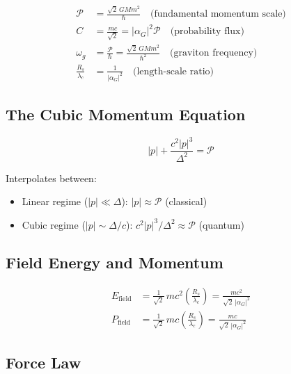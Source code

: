 \documentclass[11pt,a4paper]{article}
\theoremstyle{definition}
\theoremstyle{remark}
\begin{document}
	\begin{align}
		\mathcal{P} &= \frac{\sqrt{2}\,GMm^2}{\hbar} \quad\text{(fundamental momentum scale)} \\
		C &= \frac{mc}{\sqrt{2}} = |\alpha_G|^2\mathcal{P} \quad\text{(probability flux)} \\
		\omega_g &= \frac{\mathcal{P}}{\hbar} = \frac{\sqrt{2}\,GMm^2}{\hbar^2} \quad\text{(graviton frequency)} \\
		\frac{R_s}{\lambda_c} &= \frac{1}{|\alpha_G|^2} \quad\text{(length-scale ratio)}
	\end{align}
	
	\subsection{The Cubic Momentum Equation}
	
	\begin{equation}
		\boxed{|p| + \frac{c^2|p|^3}{\Delta^2} = \mathcal{P}}
	\end{equation}
	
	Interpolates between:
	\begin{itemize}
		\item Linear regime ($|p|\ll\Delta$): $|p|\approx\mathcal{P}$ (classical)
		\item Cubic regime ($|p|\sim\Delta/c$): $c^2|p|^3/\Delta^2\approx\mathcal{P}$ (quantum)
	\end{itemize}
	
	\subsection{Field Energy and Momentum}
	
	\begin{align}
		E_{\mathrm{field}} &= \frac{1}{\sqrt{2}}\,mc^2\left(\frac{R_s}{\lambda_c}\right) = \frac{mc^2}{\sqrt{2}\,|\alpha_G|^2} \\
		P_{\mathrm{field}} &= \frac{1}{\sqrt{2}}\,mc\left(\frac{R_s}{\lambda_c}\right) = \frac{mc}{\sqrt{2}\,|\alpha_G|^2}
	\end{align}
	
	\subsection{Force Law}
	\label{sec:summary_force_law}
\end{document}
